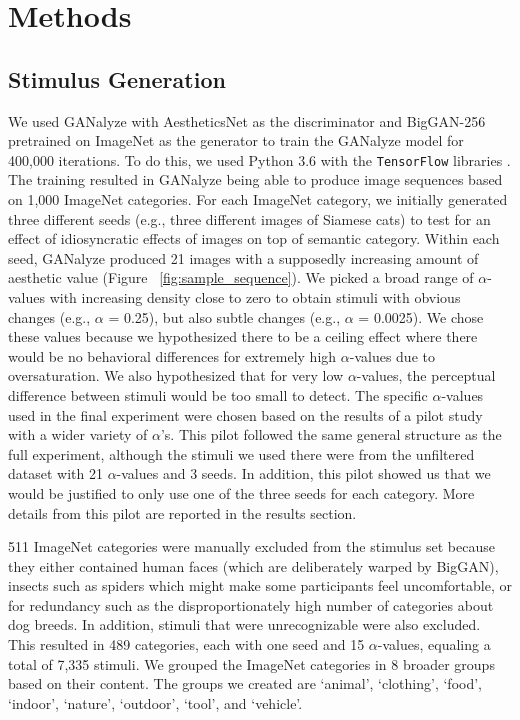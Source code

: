 \documentclass[../main.tex]{subfiles}
\begin{document}
\section{Methods}
\subsection{Stimulus Generation}
We used GANalyze with AestheticsNet \parencite{kongPhotoAestheticsRanking2016} as the discriminator and BigGAN-256 \parencite{brockLargeScaleGAN2019} pretrained on ImageNet \parencite{russakovskyImageNetLargeScale2015} as the generator to train the GANalyze model for 400,000 iterations. To do this, we used Python 3.6 with the \texttt{TensorFlow} libraries \parencite{abadi2016tensorflow}. The training resulted in GANalyze being able to produce image sequences based on 1,000 ImageNet categories. For each ImageNet category, we initially generated three different seeds (e.g., three different images of Siamese cats) to test for an effect of idiosyncratic effects of images on top of semantic category. Within each seed, GANalyze produced 21 images with a supposedly increasing amount of aesthetic value (Figure ~\ref{fig:sample_sequence}). We picked a broad range of $\alpha$-values with increasing density close to zero to obtain stimuli with obvious changes (e.g., $\alpha$ = 0.25), but also subtle changes (e.g., $\alpha$ = 0.0025). We chose these values because we hypothesized there to be a ceiling effect where there would be no behavioral differences for extremely high $\alpha$-values due to oversaturation. We also hypothesized that for very low $\alpha$-values, the perceptual difference between stimuli would be too small to detect. The specific $\alpha$-values used in the final experiment were chosen based on the results of a pilot study with a wider variety of $\alpha$'s. This pilot followed the same general structure as the full experiment, although the stimuli we used there were from the unfiltered dataset with 21 $\alpha$-values and 3 seeds. In addition, this pilot showed us that we would be justified to only use one of the three seeds for each category. More details from this pilot are reported in the results section.
	
511 ImageNet categories were manually excluded from the stimulus set because they either contained human faces (which are deliberately warped by BigGAN), insects such as spiders which might make some participants feel uncomfortable, or for redundancy such as the disproportionately high number of categories about dog breeds. In addition, stimuli that were unrecognizable were also excluded. This resulted in 489 categories, each with one seed and 15 $\alpha$-values, equaling a total of 7,335 stimuli. We grouped the ImageNet categories in 8 broader groups based on their content. The groups we created are `animal', `clothing', `food', `indoor', `nature', `outdoor', `tool', and `vehicle'.
	
\end{document}
